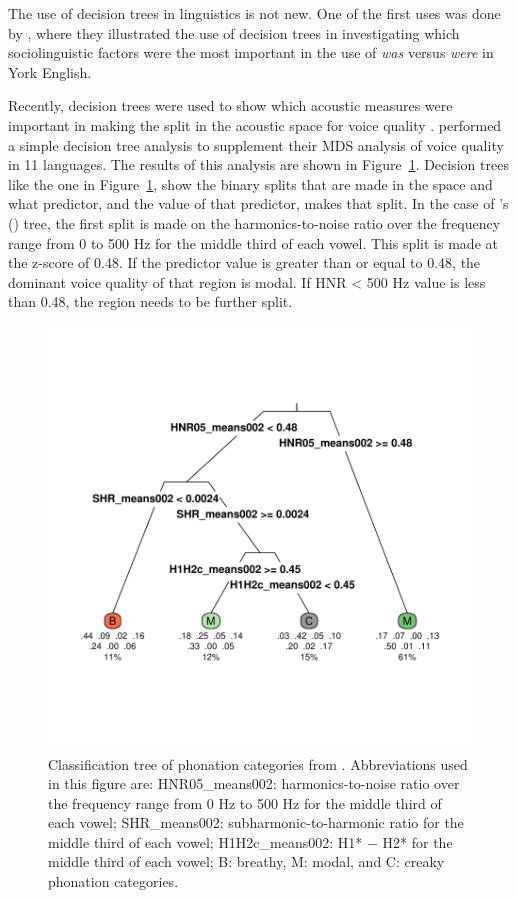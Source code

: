 The use of decision trees in linguistics is not new. One of the first uses was done by \citet{tagliamonteModelsForestsTrees2012}, where they illustrated the use of decision trees in investigating which sociolinguistic factors were the most important in the use of \textit{was} versus \textit{were} in York English. 

Recently, decision trees were used to show which acoustic measures were important in making the split in the acoustic space for voice quality \citep{keatingCrosslanguageAcousticSpace2023}. \citeauthor{keatingCrosslanguageAcousticSpace2023} performed a simple decision tree analysis to supplement their MDS analysis of voice quality in 11 languages. The results of this analysis are shown in Figure~\ref{fig:keating_tree}. Decision trees like the one in Figure~\ref{fig:keating_tree}, show the binary splits that are made in the space and what predictor, and the value of that predictor, makes that split. In the case of \citeauthor{keatingCrosslanguageAcousticSpace2023}'s (\citeyear{keatingCrosslanguageAcousticSpace2023}) tree, the first split is made on the harmonics-to-noise ratio over the frequency range from 0 to 500 Hz for the middle third of each vowel. This split is made at the z-score of 0.48. If the predictor value is greater than or equal to 0.48, the dominant voice quality of that region is modal. If HNR < 500 Hz value is less than 0.48, the region needs to be further split. 

\begin{figure}[h!]
    \centering
    \includegraphics[width = 0.9\linewidth]{images/keating_tree.pdf}
    \caption{Classification tree of phonation categories from \citet{keatingCrosslanguageAcousticSpace2023}. Abbreviations used in this figure are: {HNR05_means002}: harmonics-to-noise ratio over the frequency range from 0 Hz to 500 Hz for the middle third of each vowel; {SHR_means002}: subharmonic-to-harmonic ratio for the middle third of each vowel; {H1H2c_means002}: H1* − H2* for the middle third of each vowel; B: breathy, M: modal, and C: creaky phonation categories.}
    \label{fig:keating_tree}
\end{figure}


